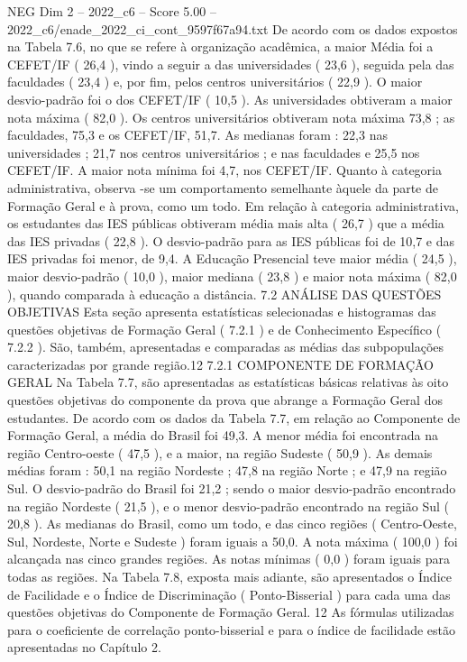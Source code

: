 \begin{textsample}{NEG Dim 2 – 2022\_c6 – Score 5.00 – 2022\_c6/enade\_2022\_ci\_cont\_9597f67a94.txt}
De acordo com os dados expostos na Tabela 7.6, no que se refere à organização acadêmica, a maior Média foi a CEFET/IF ( 26,4 ), vindo a seguir a das universidades ( 23,6 ), seguida pela das faculdades ( 23,4 ) e, por fim, pelos centros universitários ( 22,9 ).
O maior desvio-padrão foi o dos CEFET/IF ( 10,5 ).
As universidades obtiveram a maior nota máxima ( 82,0 ).
Os centros universitários obtiveram nota máxima 73,8 ; as faculdades, 75,3 e os CEFET/IF, 51,7.
As medianas foram : 22,3 nas universidades ; 21,7 nos centros universitários ; e nas faculdades e 25,5 nos CEFET/IF.
A maior nota mínima foi 4,7, nos CEFET/IF.
Quanto à categoria administrativa, observa -se um comportamento semelhante àquele da parte de Formação Geral e à prova, como um todo.
Em relação à categoria administrativa, os estudantes das IES públicas obtiveram média mais alta ( 26,7 ) que a média das IES privadas ( 22,8 ).
O desvio-padrão para as IES públicas foi de 10,7 e das IES privadas foi menor, de 9,4.
A Educação Presencial teve maior média ( 24,5 ), maior desvio-padrão ( 10,0 ), maior mediana ( 23,8 ) e maior nota máxima ( 82,0 ), quando comparada à educação a distância. 7.2 ANÁLISE DAS QUESTÕES OBJETIVAS Esta seção apresenta estatísticas selecionadas e histogramas das questões objetivas de Formação Geral ( 7.2.1 ) e de Conhecimento Específico ( 7.2.2 ).
São, também, apresentadas e comparadas as médias das subpopulações caracterizadas por grande região.12 7.2.1 COMPONENTE DE FORMAÇÃO GERAL Na Tabela 7.7, são apresentadas as estatísticas básicas relativas às oito questões objetivas do componente da prova que abrange a Formação Geral dos estudantes.
De acordo com os dados da Tabela 7.7, em relação ao Componente de Formação Geral, a média do Brasil foi 49,3.
A menor média foi encontrada na região Centro-oeste ( 47,5 ), e a maior, na região Sudeste ( 50,9 ).
As demais médias foram : 50,1 na região Nordeste ; 47,8 na região Norte ; e 47,9 na região Sul.
O desvio-padrão do Brasil foi 21,2 ; sendo o maior desvio-padrão encontrado na região Nordeste ( 21,5 ), e o menor desvio-padrão encontrado na região Sul ( 20,8 ).
As medianas do Brasil, como um todo, e das cinco regiões ( Centro-Oeste, Sul, Nordeste, Norte e Sudeste ) foram iguais a 50,0.
A nota máxima ( 100,0 ) foi alcançada nas cinco grandes regiões.
As notas mínimas ( 0,0 ) foram iguais para todas as regiões.
Na Tabela 7.8, exposta mais adiante, são apresentados o Índice de Facilidade e o Índice de Discriminação ( Ponto-Bisserial ) para cada uma das questões objetivas do Componente de Formação Geral. 12 As fórmulas utilizadas para o coeficiente de correlação ponto-bisserial e para o índice de facilidade estão apresentadas no Capítulo 2.

\end{textsample}
